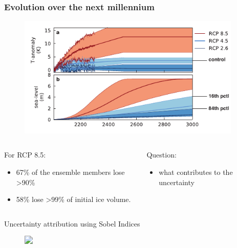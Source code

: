 \documentclass[hide notes,intlimits]{beamer}
\begin{document}
\begin{frame}
  \frametitle{Evolution over the next millennium}
  \begin{figure}
    \includegraphics[width=0.95\textwidth]{gris-les}
  \end{figure}
  \begin{columns}[c]
    \begin{column}{.6\linewidth}
  \small{
    For RCP 8.5:
  \begin{itemize}
  \item 67\% of the ensemble members lose >90\%
  \item 58\% lose >99\% of initial ice volume.
  \end{itemize}
  }
    \end{column}
    \begin{column}{.4\linewidth}
      \small{
        Question:
      \begin{itemize}
      \item what contributes to the uncertainty
      \end{itemize}
      }
    \end{column}
  \end{columns}
\end{frame}


\begin{frame}{Uncertainty attribution using Sobel Indices}
  \begin{figure}
    \includegraphics<1>[width=\textwidth]{sobel_ts}
  \end{figure}
\end{frame}
\end{document}
